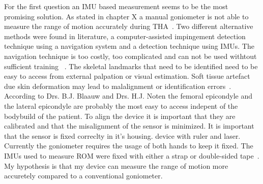 \documentclass[whitelogo]{tudelft-report}
\begin{document}
{For the first question an IMU based measurement seems to be the most promising solution. As stated in chapter X a manual goniometer is not able to measure the range of motion accurately during THA~\cite{chevillotte2009variability}\cite{woerner2016visual}\cite{mohsin2015factors}\cite{kilgour2003intrarater}\cite{nussbaumer2010validity}\cite{mutlu2007reliability}\cite{holm2000reliability}\cite{roach2013concurrent}. Two different alternative methods were found in literature, a computer-assisted impingement detection technique using a navigation system and a detection technique using IMUs. The navigation technique is too costly, too complicated and can not be used withtout sufficient training ~\cite{bloomfield2018proposal}\cite{charlton2015reliability}\cite{renkawitz2012development}. The skeletal landmarks that need to be identified need to be easy to access from external palpation or visual estimation. Soft tissue artefact due skin deformation may lead to malalignment or identification errors~\cite{kratzenstein2012effective}. According to Drs. B.J. Blaauw and Drs. H.J. Noten\cite{blaauw_2018} the femoral epicondyle and the lateral epicondyle are probably the most easy to access indepent of the bodybuild of the patient. To align the device it is important that they are calibrated and that the misalignment of the sensor is minimized. It is important that the sensor is fixed correclty in it's housing\cite{vargas2016imu}.   device with ruler and laser.
Currently the goniometer requires the usage of both hands to keep it fixed. The IMUs used to measure ROM were fixed with either a strap or double-sided tape~\cite{zugner2019validation}\cite{bergmann2009portable}\cite{bakhshi2011development}\cite{vargas2016imu}\cite{nussbaumer2010validity}.   
\newline
\newline
My hypothesis is that my device can measure the range of motion more accuretely compared to a conventional goniometer.

}
\end{document}
